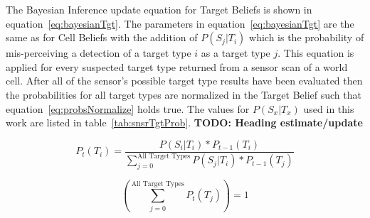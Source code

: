 \begin{multicols*}{2}
The Bayesian Inference update equation for Target Beliefs is shown in equation~\ref{eq:bayesianTgt}.  The parameters in equation~\ref{eq:bayesianTgt} are the same as for Cell Beliefs with the addition of $P(S_{j}|T_{i})$ which is the probability of mis-perceiving a detection of a target type $i$ as a target type $j$.  This equation is applied for every suspected target type returned from a sensor scan of a world cell. After all of the sensor's possible target type results have been evaluated then the probabilities for all target types are normalized in the Target Belief such that equation~\ref{eq:probsNormalize} holds true.  The values for $P(S_{x}|T_{x})$ used in this work are listed in table~\ref{tab:snsrTgtProb}. \textbf{TODO: Heading estimate/update}






\begin{equation}
\label{eq:bayesianTgt}
P_{t}(T_{i}) = \frac{P(S_{i}|T_{i})*P_{t-1}(T_{i})}{ \sum_{j=0}^{\text{All Target Types}}P(S_{j}|T_{i}) * P_{t-1}(T_{j}) }
\end{equation}

\begin{equation}
\label{eq:probsNormalize}
\left( \sum_{j=0}^{\text{All Target Types}}P_{t}(T_{j})\right)  = 1
\end{equation}


\end{multicols*}
